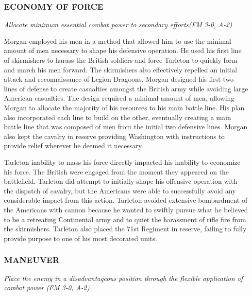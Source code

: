 \subsubsection{ECONOMY OF FORCE}

\textit{Allocate minimum essential combat power to secondary efforts(FM 3-0, A-2)}

Morgan employed his men in a method that allowed him to use the minimal amount
of men necessary to shape his defensive operation.  He used his first line of
skirmishers to harass the British soldiers and force Tarleton to quickly form
and march his men forward.  The skirmishers also effectively repelled an
initial attack and reconnaissance of Legion Dragoons.  Morgan designed his
first two lines of defense to create casualties amongst the British army while
avoiding large American casualties.  The design required a minimal amount of
men, allowing Morgan to allocate the majority of his resources to his main
battle line.  His plan also incorporated each line to build on the other,
eventually creating a main battle line that was composed of men from the
initial two defensive lines.  Morgan also kept the cavalry in reserve providing
Washington with instructions to provide relief wherever he deemed it necessary.  

Tarleton inability to mass his force directly impacted his inability to
economize his force.  The British were engaged from the moment they appeared on
the battlefield.  Tarleton did attempt to initially shape his offensive
operation with the dispatch of cavalry, but the Americans were able to
successfully avoid any considerable impact from this action.  Tarleton avoided
extensive bombardment of the Americans with cannon because he wanted to swiftly
pursue what he believed to be a retreating Continental army and to quiet the
harassment of rifle fire from the skirmishers.  Tarleton also placed the 71st
Regiment in reserve, failing to fully provide purpose to one of his most
decorated units.    

\subsubsection{MANEUVER}

\textit{Place the enemy in a disadvantageous position through the flexible
application of combat power (FM 3-0, A-2)}

